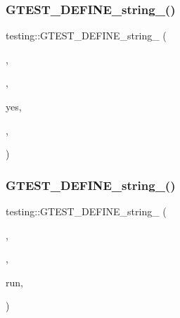 \subsubsection{\texorpdfstring{GTEST\_DEFINE\_string\_()}{GTEST\_DEFINE\_string\_()}\hspace{0.1cm}{\footnotesize\ttfamily [2/5]}}
{\footnotesize\ttfamily testing\+::\+G\+T\+E\+S\+T\+\_\+\+D\+E\+F\+I\+N\+E\+\_\+string\+\_\+ (\begin{DoxyParamCaption}\item[{color}]{,  }\item[{\mbox{\hyperlink{namespacetesting_1_1internal_a7ed785df46a339403b0f749d3a879201}{internal\+::\+String\+From\+G\+Test\+Env}}(\char`\"{}color\char`\"{}, \char`\"{}auto\char`\"{})}]{,  }\item[{\char`\"{}Whether to use colors in the output. Valid values\+:}]{yes,  }\item[{no}]{,  }\item[{\char`\"{} \char`\"{}and auto. \textquotesingle{}auto\textquotesingle{} means to use colors if the output is \char`\"{} \char`\"{}being sent to a terminal and the T\+E\+RM environment variable \char`\"{} \char`\"{}is set to a terminal type that supports colors.\char`\"{}}]{ }\end{DoxyParamCaption})}

\mbox{\label{namespacetesting_a2830ee1f2237233fa44aa580c5a919ce}} 
\subsubsection{\texorpdfstring{GTEST\_DEFINE\_string\_()}{GTEST\_DEFINE\_string\_()}\hspace{0.1cm}{\footnotesize\ttfamily [3/5]}}
{\footnotesize\ttfamily testing\+::\+G\+T\+E\+S\+T\+\_\+\+D\+E\+F\+I\+N\+E\+\_\+string\+\_\+ (\begin{DoxyParamCaption}\item[{filter}]{,  }\item[{\mbox{\hyperlink{namespacetesting_1_1internal_a7ed785df46a339403b0f749d3a879201}{internal\+::\+String\+From\+G\+Test\+Env}}(\char`\"{}filter\char`\"{}, Get\+Default\+Filter())}]{,  }\item[{\char`\"{}A colon-\/separated list of glob (not regex) patterns \char`\"{} \char`\"{}for filtering the tests to}]{run,  }\item[{optionally followed by a \char`\"{} \char`\"{}\textquotesingle{}-\/\textquotesingle{} and a \+:separated list of negative patterns(tests to \char`\"{} \char`\"{}exclude). A \mbox{\hyperlink{_mutual_8h_a707ee03719e99670bf6cfdfd897b8456}{test}} is run if it matches one of the positive \char`\"{} \char`\"{}patterns and does not match any of the negative patterns.\char`\"{}}]{ }\end{DoxyParamCaption})}

